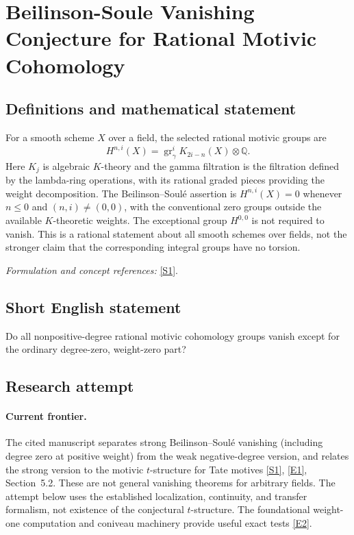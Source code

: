 \documentclass[11pt,a4paper]{article}
\newcommand{\Q}{\mathbb{Q}}
\newcommand{\sref}[2]{\hyperlink{source:#1:#2}{[S#2]}}
\newcommand{\eref}[2]{\hyperlink{extra:#1:#2}{[E#2]}}
\newif\ifshowcatalogue
\newcommand{\cataloguescope}[1]{\ifshowcatalogue
 \paragraph{Exact scope in the supplied catalogue.}
 \begin{quote}\small #1\end{quote}\fi}
\numberwithin{equation}{section}
\begin{document}
\setcounter{section}{0}
\clearpage
\section*{\texorpdfstring{Beilinson-Soule Vanishing Conjecture for Rational Motivic Cohomology}{Beilinson-Soule Vanishing Conjecture for Rational Motivic Cohomology}}\label{statement}
\subsection{Definitions and mathematical statement}
For a smooth scheme $X$ over a field, the selected rational motivic groups are
\[
 H^{n,i}(X)=\operatorname{gr}_{\gamma}^{i}K_{2i-n}(X)\otimes\Q.
\]
Here $K_j$ is algebraic $K$-theory and the gamma filtration is the filtration defined by the lambda-ring operations, with its rational graded pieces providing the weight decomposition. The Beilinson--Soul\'e assertion is
$H^{n,i}(X)=0$ whenever $n\le0$ and $(n,i)\ne(0,0)$, with the conventional zero groups outside the available $K$-theoretic weights. The exceptional group $H^{0,0}$ is not required to vanish. This is a rational statement about all smooth schemes over fields, not the stronger claim that the corresponding integral groups have no torsion.
\par\smallskip\textit{Formulation and concept references:} \sref{statement}{1}.
\cataloguescope{Prove that for every smooth scheme X over a field k the rational motivic cohomology groups H\textasciicircum{}(n,i)(X), defined as the i-th graded piece for the gamma filtration on K\_(2i-n)(X) tensored with the rationals, vanish whenever n <= 0 and the pair (n,i) is not (0,0).}
\subsection{Short English statement}
Do all nonpositive-degree rational motivic cohomology groups vanish except for the ordinary degree-zero, weight-zero part?
\subsection{Research attempt}

\paragraph{Current frontier.}
The cited manuscript separates strong Beilinson--Soul\'e vanishing (including degree zero at positive weight) from the weak negative-degree version, and relates the strong version to the motivic $t$-structure for Tate motives \sref{statement}{1}, \eref{statement}{1}, Section~5.2. These are not general vanishing theorems for arbitrary fields. The attempt below uses the established localization, continuity, and transfer formalism, not existence of the conjectural $t$-structure. The foundational weight-one computation and coniveau machinery provide useful exact tests \eref{statement}{2}.
\end{document}
